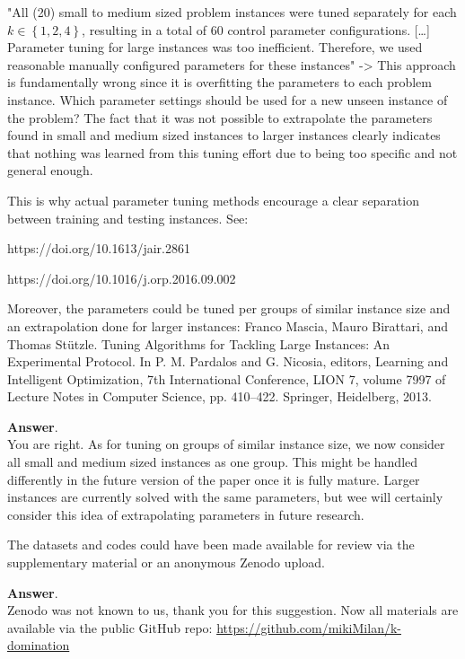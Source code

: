 \documentclass [11pt]{scrartcl}
\begin{document}
\begin{leftbar}
"All (20) small to medium sized problem instances were tuned separately for each $k\in\left\lbrace 1, 2, 4\right\rbrace $, resulting in a total of 60 control parameter configurations. […] Parameter tuning for large instances was too inefficient. Therefore, we used reasonable manually configured parameters for these
instances"
-> This approach is fundamentally wrong since it is overfitting the parameters to each problem instance. Which parameter settings should be used for a new unseen instance of the problem? The fact that it was not possible to extrapolate the parameters found in small and medium sized instances to larger instances clearly indicates that nothing was learned from this tuning effort due to being too specific and not general enough.

This is why actual parameter tuning methods encourage a clear separation between training and testing instances. See:

https://doi.org/10.1613/jair.2861

https://doi.org/10.1016/j.orp.2016.09.002

Moreover, the parameters could be tuned per groups of similar instance size and an extrapolation done for larger instances: Franco Mascia, Mauro Birattari, and Thomas Stützle. Tuning Algorithms for Tackling Large Instances: An Experimental Protocol. In P. M. Pardalos and G. Nicosia, editors, Learning and Intelligent Optimization, 7th International Conference, LION 7, volume 7997 of Lecture Notes in Computer Science, pp. 410–422. Springer, Heidelberg, 2013.	
\end{leftbar}

\textbf{Answer}. \\
You are right.
As for tuning on groups of similar instance size, we now consider all small and medium sized instances as one group. This might be handled differently in the future version of the paper once it is fully mature.
Larger instances are currently solved with the same parameters, but wee will certainly consider this idea of extrapolating parameters in future research.  

\begin{leftbar}
The datasets and codes could have been made available for review via the supplementary material or an anonymous Zenodo upload.
\end{leftbar}

\textbf{Answer}. \\
Zenodo was not known to us, thank you for this suggestion.
Now all materials are available via the public GitHub repo:
\url{https://github.com/mikiMilan/k-domination}
\end{document}
